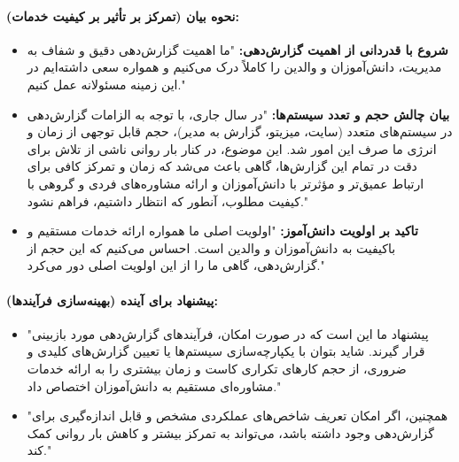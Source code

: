 \documentclass[12pt]{article}
\begin{document}
\paragraph{نحوه بیان (تمرکز بر تأثیر بر کیفیت خدمات):}
\begin{itemize}
    \item \textbf{شروع با قدردانی از اهمیت گزارش‌دهی:} "ما اهمیت گزارش‌دهی دقیق و شفاف به مدیریت، دانش‌آموزان و والدین را کاملاً درک می‌کنیم و همواره سعی داشته‌ایم در این زمینه مسئولانه عمل کنیم."
    \item \textbf{بیان چالش حجم و تعدد سیستم‌ها:} "در سال جاری، با توجه به الزامات گزارش‌دهی در سیستم‌های متعدد (سایت، میزیتو، گزارش به مدیر)، حجم قابل توجهی از زمان و انرژی ما صرف این امور شد. این موضوع، در کنار بار روانی ناشی از تلاش برای دقت در تمام این گزارش‌ها، گاهی باعث می‌شد که زمان و تمرکز کافی برای ارتباط عمیق‌تر و مؤثرتر با دانش‌آموزان و ارائه مشاوره‌های فردی و گروهی با کیفیت مطلوب، آنطور که انتظار داشتیم، فراهم نشود."
    \item \textbf{تاکید بر اولویت دانش‌آموز:} "اولویت اصلی ما همواره ارائه خدمات مستقیم و باکیفیت به دانش‌آموزان و والدین است. احساس می‌کنیم که این حجم از گزارش‌دهی، گاهی ما را از این اولویت اصلی دور می‌کرد."
\end{itemize}

\paragraph{پیشنهاد برای آینده (بهینه‌سازی فرآیندها):}
\begin{itemize}
    \item "پیشنهاد ما این است که در صورت امکان، فرآیندهای گزارش‌دهی مورد بازبینی قرار گیرند. شاید بتوان با یکپارچه‌سازی سیستم‌ها یا تعیین گزارش‌های کلیدی و ضروری، از حجم کارهای تکراری کاست و زمان بیشتری را به ارائه خدمات مشاوره‌ای مستقیم به دانش‌آموزان اختصاص داد."
    \item "همچنین، اگر امکان تعریف شاخص‌های عملکردی مشخص و قابل اندازه‌گیری برای گزارش‌دهی وجود داشته باشد، می‌تواند به تمرکز بیشتر و کاهش بار روانی کمک کند."
\end{itemize}
\end{document}
